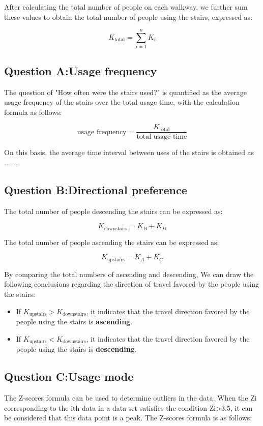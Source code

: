 \documentclass{mcmthesis}
\begin{document}
After calculating the total number of people on each walkway, we further sum these values to obtain the total number of people using the stairs, expressed as:

\[ K_{\text{total}} = \sum_{i=1}^n K_i \]


\subsection{Question A:Usage frequency}

The question of "How often were the stairs used?" is quantified as the average usage frequency of the stairs over the total usage time, with the calculation formula as follows:

\[ \text{usage frequency} = \frac{K_{\text{total}}}{\text{total usage time}} \]

On this basis, the average time interval between uses of the stairs is obtained as .......

\subsection{Question B:Directional preference}

The total number of people descending the stairs can be expressed as:

\[ K_{\text{downstairs}} = K_B + K_D \]

The total number of people ascending the stairs can be expressed as:

\[ K_{\text{upstairs}} = K_A + K_C \]

By comparing the total numbers of ascending and descending, We can draw the following conclusions regarding the direction of travel favored by the people using the stairs:

\begin{itemize} 

\item If $K_{\text{upstairs}}>K_{\text{downstairs}}$, it indicates that the travel direction favored by the people using the stairs is \textbf{ascending}. %

\item If $K_{\text{upstairs}}<K_{\text{downstairs}}$, it indicates that the travel direction favored by the people using the stairs is \textbf{descending}. %

\end{itemize}


\subsection{Question C:Usage mode}
The Z-scores formula can be used to determine outliers in the data. When the Zi corresponding to the ith data in a data set satisfies the condition Zi>3.5\cite{curtis2016mystery},  it can be considered that this data point is a peak. The Z-scores formula is as follows:
\end{document}

